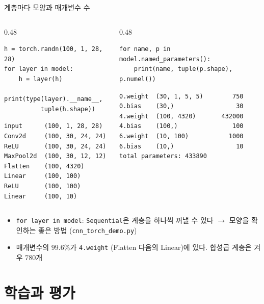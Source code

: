 \documentclass[aspectratio=169,11pt]{beamer}
\newcommand{\code}[1]{\texttt{#1}}
\begin{document}
\begin{frame}[fragile]{계층마다 모양과 매개변수 수}
\begin{columns}[T,onlytextwidth]
\begin{column}{0.48\textwidth}
\begin{lstlisting}
h = torch.randn(100, 1, 28, 28)
for layer in model:
    h = layer(h)
    print(type(layer).__name__,
          tuple(h.shape))
\end{lstlisting}
\begin{lstlisting}[style=outstyle]
input      (100, 1, 28, 28)
Conv2d     (100, 30, 24, 24)
ReLU       (100, 30, 24, 24)
MaxPool2d  (100, 30, 12, 12)
Flatten    (100, 4320)
Linear     (100, 100)
ReLU       (100, 100)
Linear     (100, 10)
\end{lstlisting}
\end{column}
\begin{column}{0.48\textwidth}
\begin{lstlisting}
for name, p in model.named_parameters():
    print(name, tuple(p.shape), p.numel())
\end{lstlisting}
\begin{lstlisting}[style=outstyle]
0.weight  (30, 1, 5, 5)        750
0.bias    (30,)                 30
4.weight  (100, 4320)       432000
4.bias    (100,)               100
6.weight  (10, 100)           1000
6.bias    (10,)                 10
total parameters: 433890
\end{lstlisting}
\end{column}
\end{columns}
\vskip1mm
\small
\begin{itemize}
\item \code{for layer in model}: \code{Sequential}은 계층을 하나씩 꺼낼 수 있다 $\to$ 모양을 확인하는 좋은 방법 (\code{cnn\_torch\_demo.py})
\item 매개변수의 $99.6\%$가 \code{4.weight} (Flatten 다음의 Linear)에 있다. 합성곱 계층은 겨우 $780$개
\end{itemize}
\end{frame}

\section{학습과 평가}
\end{document}

